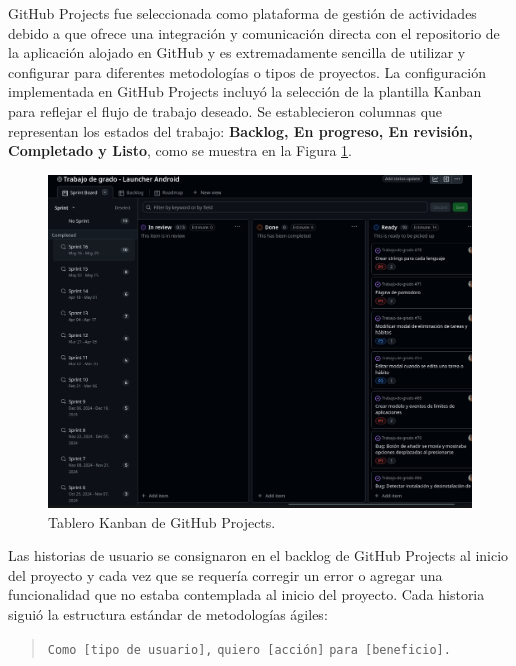 GitHub Projects fue seleccionada como plataforma de gestión de actividades debido a que ofrece una integración y comunicación directa con el repositorio de la aplicación alojado en GitHub y es extremadamente sencilla de utilizar y configurar para diferentes metodologías o tipos de proyectos. La configuración implementada en GitHub Projects incluyó la selección de la plantilla Kanban para reflejar el flujo de trabajo deseado. Se establecieron columnas que representan los estados del trabajo: \textbf{Backlog, En progreso, En revisión, Completado y Listo}, como se muestra en la Figura \ref{fig:github_projects_tablero_kanban}.

\begin{figure}[ht]
  \caption{Tablero Kanban de GitHub Projects.}
  \label{fig:github_projects_tablero_kanban}
  \includegraphics[width=\textwidth]{Figuras/github_projects_tablero_kanban.png}
  \centering
\end{figure}

Las historias de usuario se consignaron en el backlog de GitHub Projects al inicio del proyecto y cada vez que se requería corregir un error o agregar una funcionalidad que no estaba contemplada al inicio del proyecto. Cada historia siguió la estructura estándar de metodologías ágiles: 

\begin{quote}
\centering
\texttt{Como [tipo de usuario],}
\newline
\texttt{quiero [acción]}
\newline
\texttt{para [beneficio].}
\end{quote}

